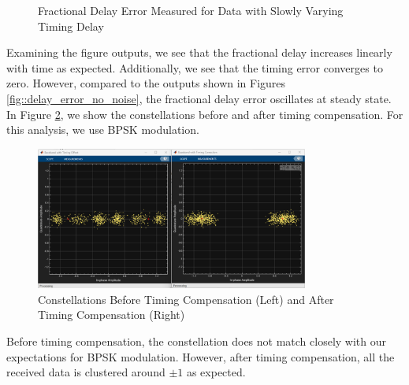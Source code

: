 \documentclass{article}
\begin{document}
\begin{figure}[H]
	\centerline{}
	\caption{Fractional Delay Error Measured for Data with Slowly Varying Timing Delay}
	\label{fig::fractional_delay_error_timing_offset}
\end{figure}

\noindent Examining the figure outputs, we see that the fractional delay increases linearly with time as expected. Additionally, we see that the timing error converges to zero. However, compared to the outputs shown in Figures \ref{fig::delay_error_no_noise}, the fractional delay error oscillates at steady state. In Figure \ref{fig::constellations_with_timing_correction}, we show the constellations before and after timing compensation. For this analysis, we use BPSK modulation.
 
\begin{figure}[H]
	\centerline{\includegraphics[width=0.8\textwidth]{constellations_with_timing_correction.png}}
	\caption{Constellations Before Timing Compensation (Left) and After Timing Compensation (Right)}
	\label{fig::constellations_with_timing_correction}
\end{figure}

\noindent Before timing compensation, the constellation does not match closely with our expectations for BPSK modulation. However, after timing compensation, all the received data is clustered around $\pm 1$ as expected.
\end{document}
